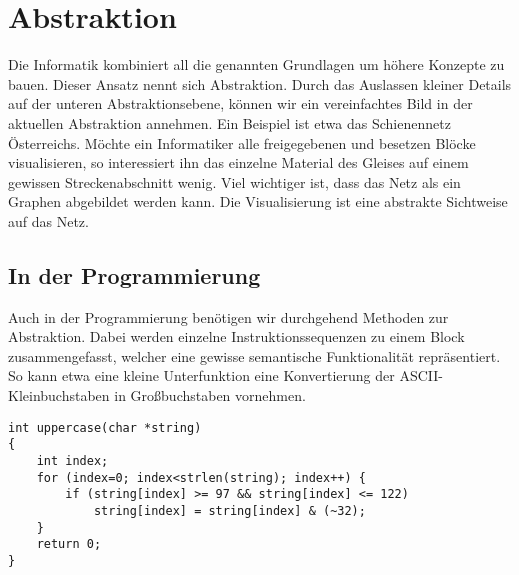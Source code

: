 \chapter{Abstraktion}
%
Die Informatik kombiniert all die genannten Grundlagen um höhere Konzepte
zu bauen. Dieser Ansatz nennt sich Abstraktion. Durch das Auslassen kleiner
Details auf der unteren Abstraktionsebene, können wir ein vereinfachtes Bild
in der aktuellen Abstraktion annehmen.
Ein Beispiel ist etwa das Schienennetz Österreichs. Möchte ein Informatiker
alle freigegebenen und besetzen Blöcke visualisieren, so interessiert ihn
das einzelne Material des Gleises auf einem gewissen Streckenabschnitt
wenig. Viel wichtiger ist, dass das Netz als ein Graphen abgebildet werden
kann. Die Visualisierung ist eine abstrakte Sichtweise auf das Netz.

\section{In der Programmierung}
%
Auch in der Programmierung benötigen wir durchgehend Methoden zur Abstraktion.
Dabei werden einzelne Instruktionssequenzen zu einem Block zusammengefasst,
welcher eine gewisse semantische Funktionalität repräsentiert. So kann etwa
eine kleine Unterfunktion eine Konvertierung der ASCII-Kleinbuchstaben in
Großbuchstaben vornehmen.

\begin{verbatim}
int uppercase(char *string)
{
    int index;
    for (index=0; index<strlen(string); index++) {
        if (string[index] >= 97 && string[index] <= 122)
            string[index] = string[index] & (~32);
    }
    return 0;
}
\end{verbatim}


